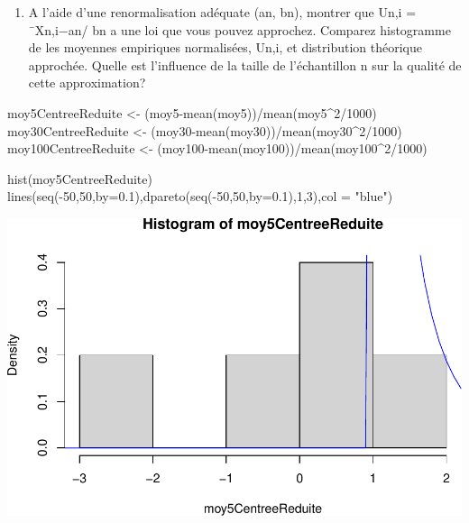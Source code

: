 \documentclass[
]{article}
\newenvironment{Shaded}{\begin{snugshade}}{\end{snugshade}}
\newcommand{\AttributeTok}[1]{\textcolor[rgb]{0.77,0.63,0.00}{#1}}
\newcommand{\DecValTok}[1]{\textcolor[rgb]{0.00,0.00,0.81}{#1}}
\newcommand{\FloatTok}[1]{\textcolor[rgb]{0.00,0.00,0.81}{#1}}
\newcommand{\FunctionTok}[1]{\textcolor[rgb]{0.00,0.00,0.00}{#1}}
\newcommand{\NormalTok}[1]{#1}
\newcommand{\OtherTok}[1]{\textcolor[rgb]{0.56,0.35,0.01}{#1}}
\newcommand{\SpecialCharTok}[1]{\textcolor[rgb]{0.00,0.00,0.00}{#1}}
\newcommand{\StringTok}[1]{\textcolor[rgb]{0.31,0.60,0.02}{#1}}
\providecommand{\tightlist}{%
  \setlength{\itemsep}{0pt}\setlength{\parskip}{0pt}}
\begin{document}
\begin{enumerate}
\def\labelenumi{\arabic{enumi}.}
\setcounter{enumi}{3}
\tightlist
\item
  A l'aide d'une renormalisation adéquate (an, bn), montrer que Un,i =
  ¯Xn,i−an/ bn a une loi que vous pouvez approchez. Comparez histogramme
  de les moyennes empiriques normalisées, Un,i, et distribution
  théorique approchée. Quelle est l'influence de la taille de
  l'échantillon n sur la qualité de cette approximation?
\end{enumerate}

\begin{Shaded}
\begin{Highlighting}[]
\NormalTok{moy5CentreeReduite }\OtherTok{\textless{}{-}}\NormalTok{ (moy5}\SpecialCharTok{{-}}\FunctionTok{mean}\NormalTok{(moy5))}\SpecialCharTok{/}\FunctionTok{mean}\NormalTok{(moy5}\SpecialCharTok{\^{}}\DecValTok{2}\SpecialCharTok{/}\DecValTok{1000}\NormalTok{)}
\NormalTok{moy30CentreeReduite }\OtherTok{\textless{}{-}}\NormalTok{ (moy30}\SpecialCharTok{{-}}\FunctionTok{mean}\NormalTok{(moy30))}\SpecialCharTok{/}\FunctionTok{mean}\NormalTok{(moy30}\SpecialCharTok{\^{}}\DecValTok{2}\SpecialCharTok{/}\DecValTok{1000}\NormalTok{)}
\NormalTok{moy100CentreeReduite }\OtherTok{\textless{}{-}}\NormalTok{ (moy100}\SpecialCharTok{{-}}\FunctionTok{mean}\NormalTok{(moy100))}\SpecialCharTok{/}\FunctionTok{mean}\NormalTok{(moy100}\SpecialCharTok{\^{}}\DecValTok{2}\SpecialCharTok{/}\DecValTok{1000}\NormalTok{)}

\FunctionTok{hist}\NormalTok{(moy5CentreeReduite)}
\FunctionTok{lines}\NormalTok{(}\FunctionTok{seq}\NormalTok{(}\SpecialCharTok{{-}}\DecValTok{50}\NormalTok{,}\DecValTok{50}\NormalTok{,}\AttributeTok{by=}\FloatTok{0.1}\NormalTok{),}\FunctionTok{dpareto}\NormalTok{(}\FunctionTok{seq}\NormalTok{(}\SpecialCharTok{{-}}\DecValTok{50}\NormalTok{,}\DecValTok{50}\NormalTok{,}\AttributeTok{by=}\FloatTok{0.1}\NormalTok{),}\DecValTok{1}\NormalTok{,}\DecValTok{3}\NormalTok{),}\AttributeTok{col =} \StringTok{"blue"}\NormalTok{)}
\end{Highlighting}
\end{Shaded}

\includegraphics{tp2_files/figure-latex/normalisation-1.pdf}
\end{document}
